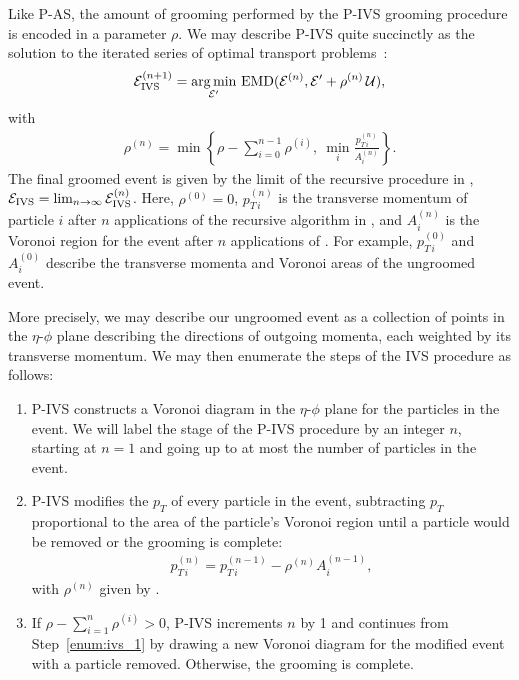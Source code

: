 \documentclass[letterpaper,11pt]{article}
\begin{document}
Like P-AS, the amount of grooming performed by the P-IVS grooming procedure is encoded in a parameter \(\rho\).
%
We may describe P-IVS quite succinctly as the solution to the iterated series of optimal transport problems~\cite{Komiske:2020qhg}:
\begin{align}
    \mathcal{E}^{(n+1)}_{\rm IVS}
    =
    \underset{\mathcal{E}'}{\arg \min} ~ {\rm EMD}
    (\mathcal{E}^{(n)}, \mathcal{E}' + \rho^{(n)}\,\mathcal{U})
    \label{eqn:ivs1}
    ,
\end{align}
with
\begin{align}
    \rho^{(n)} =
    \min\left\{
    	\rho - \sum_{i=0}^{n-1}\rho^{(i)},
	~
	\min_i \frac{p^{(n)}_{T\,i}}{A^{(n)}_i}
    \right\}
    \label{eqn:ivs2}
    .
\end{align}
%
The final groomed event is given by the limit of the recursive procedure in , \(\mathcal{E}_{\rm IVS} = \lim_{n\to\infty} \mathcal{E}^{(n)}_{\rm IVS}\).
%
Here, \(\rho^{(0)} = 0\), \(p_{T\,i}^{(n)}\) is the transverse momentum of particle \(i\) after \(n\) applications of the recursive algorithm in , and \(A_i^{(n)}\) is the Voronoi region for the event after \(n\) applications of .
%
For example, \(p_{T\, i}^{(0)}\) and \(A_i^{(0)}\) describe the transverse momenta and Voronoi areas of the ungroomed event.

More precisely, we may describe our ungroomed event as a collection of points in the \(\eta\)-\(\phi\) plane describing the directions of outgoing momenta, each weighted by its transverse momentum.
%
We may then enumerate the steps of the IVS procedure as follows:
%
\begin{enumerate}
    \item
    P-IVS constructs a Voronoi diagram in the \(\eta\)-\(\phi\) plane for the particles in the event.
    We will label the stage of the P-IVS procedure by an integer \(n\), starting at \(n = 1\) and going up to at most the number of particles in the event.
    \label{enum:ivs_1}

    \item
    P-IVS modifies the \(p_T\) of every particle in the event, subtracting \(p_T\) proportional to the area of the particle's Voronoi region until a particle would be removed or the grooming is complete:
    \begin{align}
	\label{eqn:ivs_2}
	p_{T\,i}^{(n)} = p_{T\,i}^{(n-1)} - \rho^{(n)} A^{(n-1)}_i,
    \end{align}
    with \(\rho^{(n)}\) given by .
    \label{enum:ivs_2}

    \item
    If \(\rho - \sum_{i = 1}^n \rho^{(i)} > 0\), P-IVS increments \(n\) by 1 and continues from Step~\ref{enum:ivs_1} by drawing a new Voronoi diagram for the modified event with a particle removed.
    Otherwise, the grooming is complete.
    \label{enum:ivs_3}
\end{enumerate}
\end{document}

